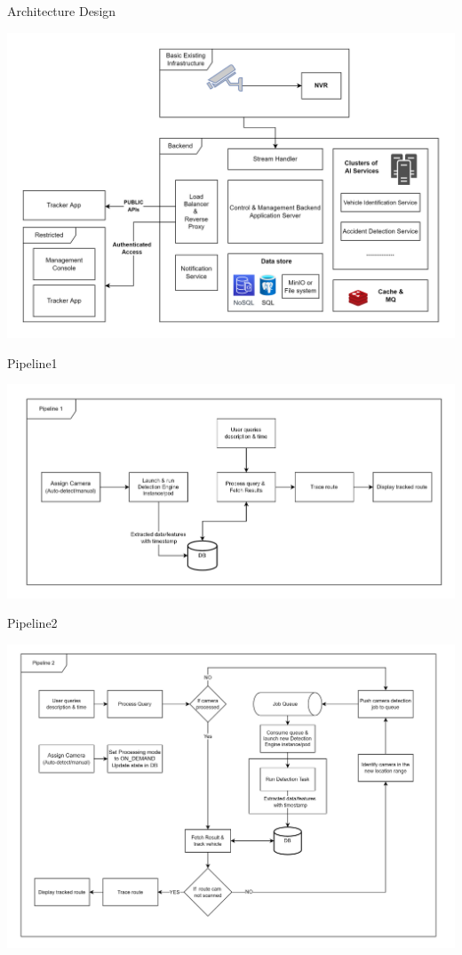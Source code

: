 \documentclass{beamer}
\begin{document}
	\begin{frame}{Architecture Design}
		\begin{center}
			\includegraphics[width=\linewidth]{res/architecture_high_level}
		\end{center}
	\end{frame}

	\begin{frame}{Pipeline1}
		\begin{center}
			\includegraphics[width=\linewidth]{res/pipeline1}
		\end{center}
	\end{frame}

	\begin{frame}{Pipeline2}
		\begin{center}
			\includegraphics[width=\linewidth]{res/pipeline2}
		\end{center}
	\end{frame}
\end{document}
